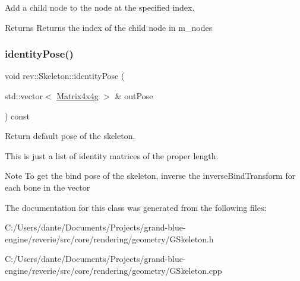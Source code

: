 Add a child node to the node at the specified index. 

\begin{DoxyReturn}{Returns}
Returns the index of the child node in m\+\_\+nodes 
\end{DoxyReturn}
\mbox{\label{classrev_1_1_skeleton_a3fcd885297975b4ce830363d7255fdf0}} 
\subsubsection{\texorpdfstring{identityPose()}{identityPose()}}
{\footnotesize\ttfamily void rev\+::\+Skeleton\+::identity\+Pose (\begin{DoxyParamCaption}\item[{std\+::vector$<$ \mbox{\hyperlink{classrev_1_1_square_matrix}{Matrix4x4g}} $>$ \&}]{out\+Pose }\end{DoxyParamCaption}) const}



Return default pose of the skeleton. 

This is just a list of identity matrices of the proper length. \begin{DoxyNote}{Note}
To get the bind pose of the skeleton, inverse the inverse\+Bind\+Transform for each bone in the vector 
\end{DoxyNote}


The documentation for this class was generated from the following files\+:\begin{DoxyCompactItemize}
\item 
C\+:/\+Users/dante/\+Documents/\+Projects/grand-\/blue-\/engine/reverie/src/core/rendering/geometry/G\+Skeleton.\+h\item 
C\+:/\+Users/dante/\+Documents/\+Projects/grand-\/blue-\/engine/reverie/src/core/rendering/geometry/G\+Skeleton.\+cpp\end{DoxyCompactItemize}
